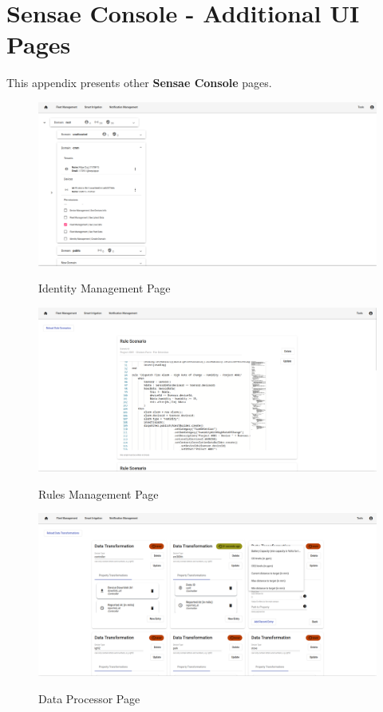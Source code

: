 \chapter{Sensae Console - Additional UI Pages}
\label{AppendixD}

This appendix presents other \textbf{Sensae Console} pages.

\begin{figure}[H]
   \centering
   \resizebox{\columnwidth}{!}
   {
      \includegraphics{assets/figures/ui/identity.png}
   }
   \caption[Identity Management Page]{Identity Management Page}
   \label{fig:AppendixD:identity}
\end{figure}

\begin{figure}[H]
   \centering
   \resizebox{\columnwidth}{!}
   {
      \includegraphics{assets/figures/ui/rules.png}
   }
   \caption[Rules Management Page]{Rules Management Page}
   \label{fig:AppendixD:rules}
\end{figure}

\begin{figure}[H]
   \centering
   \resizebox{\columnwidth}{!}
   {
      \includegraphics{assets/figures/ui/processor.png}
   }
   \caption[Data Processor Page]{Data Processor Page}
   \label{fig:AppendixD:processor}
\end{figure}

